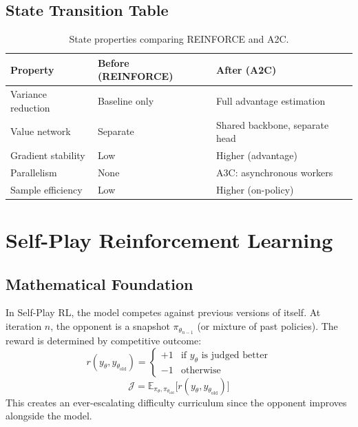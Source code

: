 \documentclass{article}
\begin{document}
\subsection{State Transition Table}
\begin{table}[h]\centering
\begin{tabular}{lll}\toprule
\textbf{Property} & \textbf{Before (REINFORCE)} & \textbf{After (A2C)}\\\midrule
Variance reduction & Baseline only & Full advantage estimation\\
Value network & Separate & Shared backbone, separate head\\
Gradient stability & Low & Higher (advantage)\\
Parallelism & None & A3C: asynchronous workers\\
Sample efficiency & Low & Higher (on-policy)\\\bottomrule
\end{tabular}
\caption{State properties comparing REINFORCE and A2C.}
\end{table}

\newpage
\section{Self-Play Reinforcement Learning}

\subsection{Mathematical Foundation}
In Self-Play RL, the model competes against previous versions of itself. At iteration $n$, the opponent is a snapshot $\pi_{\theta_{n-1}}$ (or mixture of past policies). The reward is determined by competitive outcome:
\begin{equation}
  r(y_{\theta}, y_{\theta_{\text{old}}}) = \begin{cases} +1 & \text{if } y_{\theta} \text{ is judged better} \\ -1 & \text{otherwise} \end{cases}
\end{equation}
\begin{equation}
  \mathcal{J} = \mathbb{E}_{\pi_\theta, \pi_{\theta_{\text{old}}}}\bigl[r(y_\theta, y_{\theta_{\text{old}}})\bigr]
\end{equation}
This creates an ever-escalating difficulty curriculum since the opponent improves alongside the model.
\end{document}
